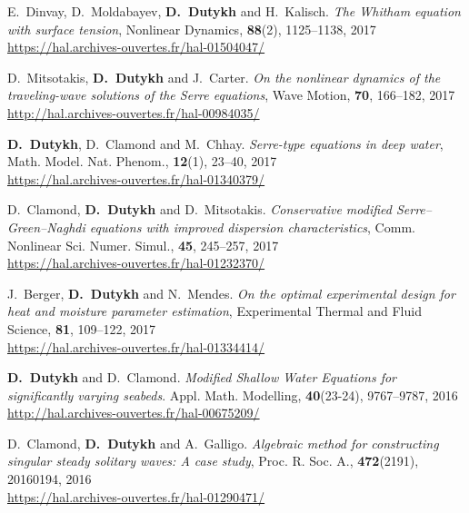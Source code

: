 \begin{etaremune}
  \item E.~Dinvay, D.~Moldabayev, \textbf{D.~Dutykh} and H.~Kalisch. \textit{The Whitham equation with surface tension}, Nonlinear Dynamics, \textbf{88}(2), 1125--1138, 2017 \\ %
  \url{https://hal.archives-ouvertes.fr/hal-01504047/}

  \item D.~Mitsotakis, \textbf{D.~Dutykh} and J.~Carter. \textit{On the nonlinear dynamics of the traveling-wave solutions of the Serre equations}, Wave Motion, \textbf{70}, 166--182, 2017 \\ %
  \url{http://hal.archives-ouvertes.fr/hal-00984035/}

  \item \textbf{D.~Dutykh}, D.~Clamond and M.~Chhay. \textit{Serre-type equations in deep water}, Math. Model. Nat. Phenom., \textbf{12}(1), 23--40, 2017 \\ %
  \url{https://hal.archives-ouvertes.fr/hal-01340379/}

  \item D.~Clamond, \textbf{D.~Dutykh} and D.~Mitsotakis. \textit{Conservative modified Serre--Green--Naghdi equations with improved dispersion characteristics}, Comm. Nonlinear Sci. Numer. Simul., \textbf{45}, 245--257, 2017 \\ %
  \url{https://hal.archives-ouvertes.fr/hal-01232370/}

  \item J.~Berger, \textbf{D.~Dutykh} and N.~Mendes. \textit{On the optimal experimental design for heat and moisture parameter estimation}, Experimental Thermal and Fluid Science, \textbf{81}, 109--122, 2017 \\ %
  \url{https://hal.archives-ouvertes.fr/hal-01334414/}
  

  \item \textbf{D.~Dutykh} and D.~Clamond. \textit{Modified Shallow Water Equations for significantly varying seabeds}. Appl. Math. Modelling, \textbf{40}(23-24), 9767--9787, 2016 \\ %
  \url{http://hal.archives-ouvertes.fr/hal-00675209/}

  \item D.~Clamond, \textbf{D.~Dutykh} and A.~Galligo. \textit{Algebraic method for constructing singular steady solitary waves: A case study}, Proc. R. Soc. A., \textbf{472}(2191), 20160194, 2016 \\ %
  \url{https://hal.archives-ouvertes.fr/hal-01290471/}
  

\end{etaremune}
